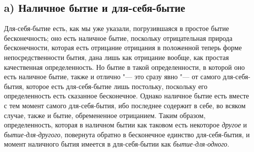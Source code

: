 \subsection*{a) Наличное бытие и для-себя-бытие}
Для-себя-бытие есть, как мы уже указали, погрузившаяся в простое бытие
бесконечность; оно есть наличное бытие, поскольку отрицательная природа
бесконечности, которая есть отрицание отрицания в положенной теперь форме
непосредственности бытия, дана лишь как отрицание вообще, как простая
качественная определенность. Но бытие в такой определенности, в которой оно
есть наличное бытие, также и отлично "--- это сразу явно "--- от самого
для-себя-бытия, которое есть для-себя-бытие лишь постольку, поскольку его
определенность есть сказанное бесконечное. Однако наличное бытие есть
вместе с тем момент самого для-себя-бытия, ибо последнее содержит в себе,
во всяком случае, также и бытие, обремененное отрицанием. Таким образом,
определенность, которая в наличном бытии как таковом есть некоторое
{\em другое} и
{\em бытие-для-другого}, повернута обратно в
бесконечное единство для-себя-бытия, и момент наличного бытия имеется в
для-себя-бытии как {\em бытие-для-одного}.

